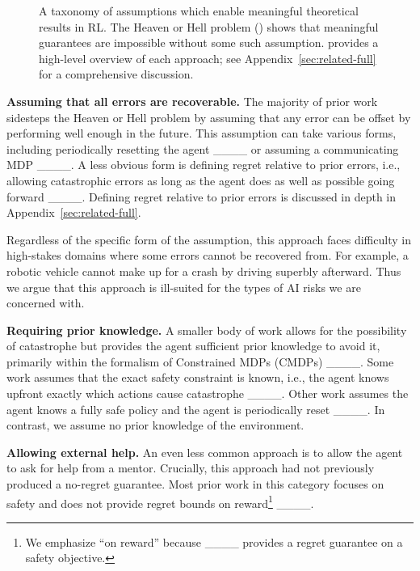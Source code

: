 



\begin{figure*}[b]
\usebox{\taxonomy}
\caption{A taxonomy of assumptions which enable meaningful theoretical results in RL. The Heaven or Hell problem () shows that meaningful guarantees are impossible without some such assumption.  provides a high-level overview of each approach; see Appendix~\ref{sec:related-full} for a comprehensive discussion.}
\label{fig:prior_work}
\end{figure*}


\textbf{Assuming that all errors are recoverable.} The majority of prior work sidesteps the Heaven or Hell problem by assuming that any error can be offset by performing well enough in the future. This assumption can take various forms, including periodically resetting the agent ____ or assuming a communicating MDP ____. A less obvious form is defining regret relative to prior errors, i.e., allowing catastrophic errors as long as the agent does as well as possible going forward  ____. Defining regret relative to prior errors is discussed in depth in Appendix~\ref{sec:related-full}. 

Regardless of the specific form of the assumption, this approach faces difficulty in high-stakes domains where some errors cannot be recovered from. For example, a robotic vehicle cannot make up for a crash by driving superbly afterward. Thus we argue that this approach is ill-suited for the types of AI risks we are concerned with.



\textbf{Requiring prior knowledge.} A smaller body of work allows for the possibility of catastrophe but provides the agent sufficient prior knowledge to avoid it, primarily within the formalism of Constrained MDPs (CMDPs) ____. Some work assumes that the exact safety constraint is known, i.e., the agent knows upfront exactly which actions cause catastrophe ____. Other work assumes the agent knows a fully safe policy and the agent is periodically reset ____. In contrast, we assume no prior knowledge of the environment.

\textbf{Allowing external help.} An even less common approach is to allow the agent to ask for help from a mentor. Crucially, this approach had not previously produced a no-regret guarantee. Most prior work in this category focuses on safety and does not provide regret bounds on reward\footnote{We emphasize ``on reward'' because ____ provides a regret guarantee on a safety objective.} ____. 

